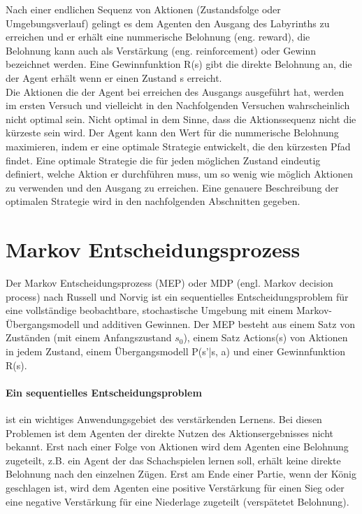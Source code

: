 Nach einer endlichen Sequenz von Aktionen (Zustandsfolge oder Umgebungsverlauf) gelingt es dem Agenten den Ausgang des Labyrinths zu erreichen und er erhält eine nummerische Belohnung (eng. reward), die Belohnung kann auch als Verstärkung (eng. reinforcement) oder Gewinn bezeichnet werden. Eine Gewinnfunktion R(s) gibt die direkte Belohnung an, die der Agent erhält wenn er einen Zustand s erreicht. \\

Die Aktionen die der Agent bei erreichen des Ausgangs ausgeführt hat, werden im ersten Versuch und vielleicht in den Nachfolgenden Versuchen wahrscheinlich nicht optimal sein. Nicht optimal in dem Sinne, dass die Aktionssequenz nicht die kürzeste sein wird. Der Agent kann den Wert für die nummerische Belohnung maximieren, indem er eine optimale Strategie entwickelt, die den kürzesten Pfad findet. Eine optimale Strategie die für jeden möglichen Zustand eindeutig definiert, welche Aktion er durchführen muss, um so wenig wie möglich Aktionen zu verwenden und den Ausgang zu erreichen. Eine genauere Beschreibung der optimalen Strategie wird in den nachfolgenden Abschnitten gegeben.\\

\section{Markov Entscheidungsprozess}
\label{sec:Markov Entscheidungsprozess}
Der Markov Entscheidungsprozess (MEP) oder MDP (engl. Markov decision process) nach Russell und Norvig \cite[752 \psqq]{Russell} ist ein sequentielles Entscheidungsproblem für eine vollständige beobachtbare, stochastische Umgebung mit einem Markov-Übergangsmodell und additiven Gewinnen. Der MEP besteht aus einem Satz von Zuständen (mit einem Anfangszustand $s_0$), einem Satz Actions(s) von Aktionen in jedem Zustand, einem Übergangsmodell P(s'|s, a) und einer Gewinnfunktion R(s). 

\paragraph{Ein sequentielles Entscheidungsproblem} ist ein wichtiges Anwendungsgebiet des verstärkenden Lernens. Bei diesen Problemen ist dem Agenten der direkte Nutzen des Aktionsergebnisses nicht bekannt. Erst nach einer Folge von Aktionen wird dem Agenten eine Belohnung zugeteilt, z.B. ein Agent der das Schachspielen lernen soll, erhält keine direkte Belohnung nach den einzelnen Zügen. Erst am Ende einer Partie, wenn der König geschlagen ist, wird dem Agenten eine positive Verstärkung für einen Sieg oder eine negative Verstärkung für eine Niederlage zugeteilt (verspätetet Belohnung).

